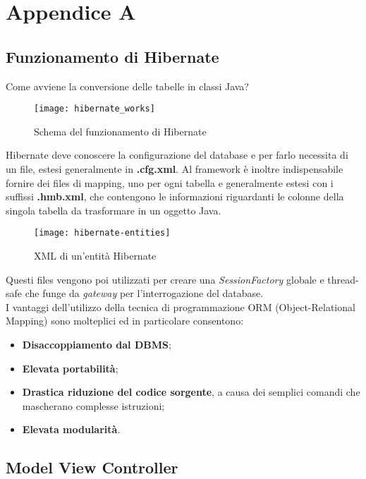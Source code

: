 
\chapter{Appendice A}

\section{Funzionamento di Hibernate} 
\label{sec:appendice-1}
Come avviene la conversione delle tabelle in classi Java?\\
\begin{figure}[h]
	\centering
	\texttt{[image: hibernate\_works]}
	\caption{Schema del funzionamento di Hibernate}
	\label{schema-generale-hibernate}
\end{figure}
Hibernate deve conoscere la configurazione del database e per farlo necessita di un file, estesi generalmente in \textbf{.cfg.xml}. Al framework è inoltre indispensabile fornire dei files di mapping, uno per ogni tabella e generalmente estesi con i suffissi \textbf{.hmb.xml}, che contengono le informazioni riguardanti le colonne della singola tabella da trasformare in un oggetto Java.\\

\begin{figure}[h]
	\centering
	\texttt{[image: hibernate-entities]}
	\caption{XML di un'entità Hibernate}
	\label{entità}
\end{figure}

Questi files vengono poi utilizzati per creare una \emph{SessionFactory} globale e thread-safe che funge da \emph{gateway} per l'interrogazione del database. \\ I vantaggi dell'utilizzo della tecnica di programmazione ORM (Object-Relational Mapping) sono molteplici ed in particolare consentono:
\begin{itemize}
	\item \textbf{Disaccoppiamento dal DBMS};
	\item \textbf{Elevata portabilità};
	\item \textbf{Drastica riduzione del codice sorgente}, a causa dei semplici comandi che mascherano complesse istruzioni;
	\item \textbf{Elevata modularità}.
\end{itemize}

\section{Model View Controller}
\label{sec:MVC}



